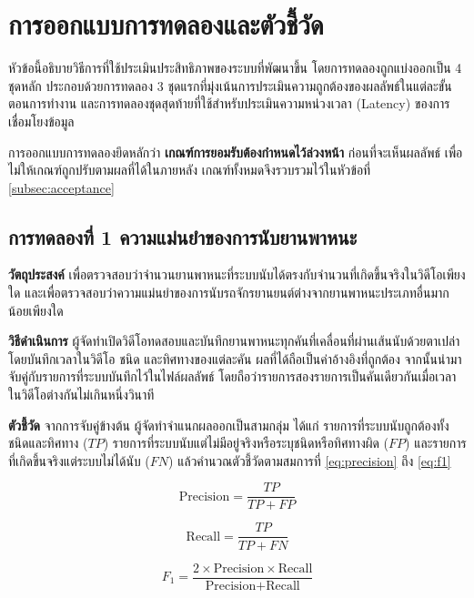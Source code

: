 \section{การออกแบบการทดลองและตัวชี้วัด}
\label{sec:experiment-design}

หัวข้อนี้อธิบายวิธีการที่ใช้ประเมินประสิทธิภาพของระบบที่พัฒนาขึ้น โดยการทดลองถูกแบ่งออกเป็น 4 ชุดหลัก ประกอบด้วยการทดลอง 3 ชุดแรกที่มุ่งเน้นการประเมินความถูกต้องของผลลัพธ์ในแต่ละขั้นตอนการทำงาน และการทดลองชุดสุดท้ายที่ใช้สำหรับประเมินความหน่วงเวลา (Latency) ของการเชื่อมโยงข้อมูล

การออกแบบการทดลองยึดหลักว่า \textbf{เกณฑ์การยอมรับต้องกำหนดไว้ล่วงหน้า} ก่อนที่จะเห็นผลลัพธ์ เพื่อไม่ให้เกณฑ์ถูกปรับตามผลที่ได้ในภายหลัง เกณฑ์ทั้งหมดจึงรวบรวมไว้ในหัวข้อที่ \ref{subsec:acceptance}

\subsection{การทดลองที่ 1 ความแม่นยำของการนับยานพาหนะ}
\label{subsec:exp-accuracy}

\textbf{วัตถุประสงค์} เพื่อตรวจสอบว่าจำนวนยานพาหนะที่ระบบนับได้ตรงกับจำนวนที่เกิดขึ้นจริงในวิดีโอเพียงใด และเพื่อตรวจสอบว่าความแม่นยำของการนับรถจักรยานยนต์ต่างจากยานพาหนะประเภทอื่นมากน้อยเพียงใด

\textbf{วิธีดำเนินการ} ผู้จัดทำเปิดวิดีโอทดสอบและบันทึกยานพาหนะทุกคันที่เคลื่อนที่ผ่านเส้นนับด้วยตาเปล่า โดยบันทึกเวลาในวิดีโอ ชนิด และทิศทางของแต่ละคัน ผลที่ได้ถือเป็นค่าอ้างอิงที่ถูกต้อง จากนั้นนำมาจับคู่กับรายการที่ระบบบันทึกไว้ในไฟล์ผลลัพธ์ โดยถือว่ารายการสองรายการเป็นคันเดียวกันเมื่อเวลาในวิดีโอต่างกันไม่เกินหนึ่งวินาที

\textbf{ตัวชี้วัด} จากการจับคู่ข้างต้น ผู้จัดทำจำแนกผลออกเป็นสามกลุ่ม ได้แก่ รายการที่ระบบนับถูกต้องทั้งชนิดและทิศทาง ($TP$) รายการที่ระบบนับแต่ไม่มีอยู่จริงหรือระบุชนิดหรือทิศทางผิด ($FP$) และรายการที่เกิดขึ้นจริงแต่ระบบไม่ได้นับ ($FN$) แล้วคำนวณตัวชี้วัดตามสมการที่ \ref{eq:precision} ถึง \ref{eq:f1}

\begin{equation}
    \text{Precision} = \frac{TP}{TP + FP}
    \label{eq:precision}
\end{equation}

\begin{equation}
    \text{Recall} = \frac{TP}{TP + FN}
    \label{eq:recall}
\end{equation}

\begin{equation}
    F_1 = \frac{2 \times \text{Precision} \times \text{Recall}}{\text{Precision} + \text{Recall}}
    \label{eq:f1}
\end{equation}

